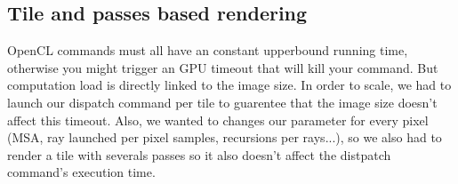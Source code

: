 \subsection{Tile and passes based rendering}
OpenCL commands must all have an constant upperbound running time, otherwise
you might trigger an GPU timeout that will kill your command. But computation
load is directly linked to the image size. In order to scale, we had to launch
our dispatch command per tile to guarentee that the image size doesn't affect
this timeout. Also, we wanted to changes our parameter for every pixel (MSA,
ray launched per pixel samples, recursions per rays...), so we also had to
render a tile with severals passes so it also doesn't affect the distpatch
command's execution time.
